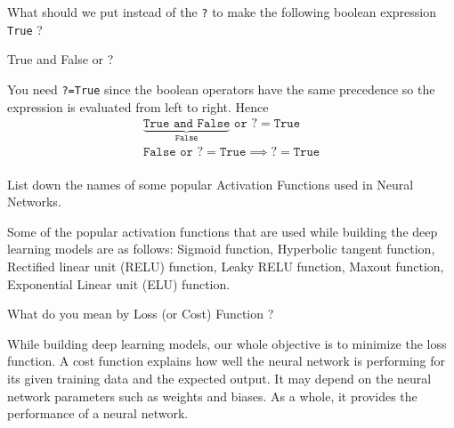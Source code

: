 \documentclass[12pt,a4paper]{exam}
\begin{document}
\question
What should we put instead of the \texttt{?} to make the following boolean expression \texttt{True} ?
\begin{ipython}
True and False or ?
\end{ipython}
\fillwithlines{3cm}
\begin{solution}
You need \texttt{?=True} since the boolean operators have the same precedence so the expression is evaluated from left to right.
Hence
\begin{equation*}
  \begin{gathered}
    \underbrace{\texttt{True and False}}_{\texttt{False}}\texttt{ or ?} = \texttt{True} \\
    \texttt{False or ?} = \texttt{True} \implies \texttt{?} = \texttt{True} \\
    \end{gathered}
\end{equation*}
\end{solution}


\question
List down the names of some popular Activation Functions used in Neural Networks.
\fillwithlines{3cm}
\begin{solution}
Some of the popular activation functions that are used while building the deep learning models are as follows:
Sigmoid function, Hyperbolic tangent function, Rectified linear unit (RELU) function, Leaky RELU function, Maxout function, Exponential Linear unit (ELU) function.
\end{solution}


\question
What do you mean by Loss (or Cost) Function ?
\fillwithlines{3cm}
\begin{solution}
While building deep learning models, our whole objective is to minimize the loss function.
A cost function explains how well the neural network is performing for its given training data and the expected output.
It may depend on the neural network parameters such as weights and biases. As a whole, it provides the performance of a neural network.
\end{solution}

\end{document}
